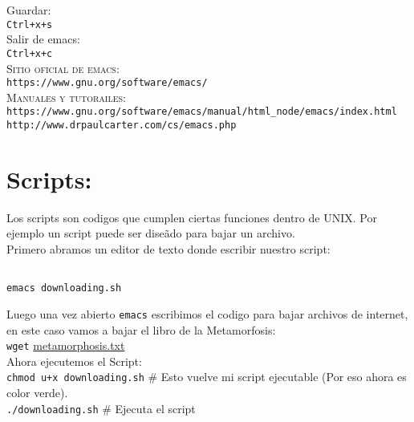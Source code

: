 \documentclass[12pt]{article}
\begin{document}
Guardar:\\

\texttt{Ctrl+x+s}\\

Salir de emacs:\\

\texttt{Ctrl+x+c}\\

\textsc{Sitio oficial de emacs:}\\
\verb"https://www.gnu.org/software/emacs/"\\

\textsc{Manuales y tutorailes:}\\
\verb"https://www.gnu.org/software/emacs/manual/html_node/emacs/index.html"\\
\verb"http://www.drpaulcarter.com/cs/emacs.php"\\


\section*{Scripts:}

Los scripts son codigos que cumplen ciertas funciones dentro de UNIX. Por ejemplo
un script puede ser dise\~ado para bajar un archivo. \\


Primero abramos un editor de texto donde escribir nuestro script:\\ 

\begin{verbatim}

emacs downloading.sh

\end{verbatim}

Luego una vez abierto \verb"emacs" escribimos el codigo para bajar archivos de internet, en este
caso vamos a bajar el libro de la Metamorfosis:\\

\verb"wget"  \href{https://raw.githubusercontent.com/jngaravitoc/HerramientasComputacionales/master/Lectures/2.Unix-TextEditors/Hands-on/metamorphosis.txt}{metamorphosis.txt} \\

Ahora ejecutemos el Script:\\

\verb"chmod u+x downloading.sh" \#  Esto vuelve mi script ejecutable (Por eso ahora es color verde).\\

\verb"./downloading.sh"   \# Ejecuta el script
\end{document}
